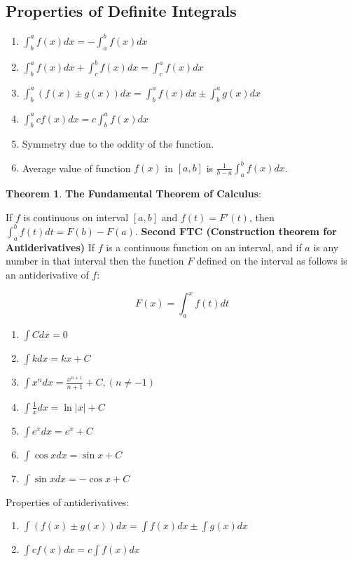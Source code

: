 \documentclass[12pt]{article}
\theoremstyle{definition}
\newtheorem{thm}{Theorem}[section]
\theoremstyle{definition}
\theoremstyle{remark}
\theoremstyle{definition}
\theoremstyle{definition}
\theoremstyle{definition}
\begin{document}
\subsection{Properties of Definite Integrals}	
	\begin{enumerate}
		\item $\int^a_b f(x) dx = -\int^b_a f(x) dx$
		\item $\int^a_b f(x) dx+\int^b_c f(x) dx=\int^a_c f(x) dx$
		\item $\int^a_b (f(x)\pm g(x)) dx=\int^a_b f(x) dx \pm \int^a_b g(x) dx$
		\item $\int^a_b cf(x) dx = c \int^a_b f(x) dx$
		\item Symmetry due to the oddity of the function.
		\item Average value of function $f(x)$ in $[a,b]$ is $\frac{1}{b-a} \int_{a}^{b}f(x)dx$.
	\end{enumerate}

\begin{thm}
\textbf{The Fundamental Theorem of Calculus}:

If $f$ is continuous on interval $[a,b]$ and $f(t)=F'(t)$, then $\int^b_a f(t) dt = F(b)-F(a).$
\textbf{Second FTC (Construction theorem for Antiderivatives)}
If $f$ is a continuous function on an interval, and if $a$ is any number in that interval then the function $F$ defined on the interval as follows is an antiderivative of $f$:

\[F(x)=\int^x_a f(t) dt\]
\end{thm}

\begin{enumerate}
\item	$\int C dx = 0$
\item	$\int kdx=kx+C$
\item	$\int x^ndx=\frac{x^{n+1}}{n+1}+C, (n \neq -1)$
\item	$\int \frac{1}{x}dx = \ln|x|+C$
\item	$\int e^xdx=e^x+C $
\item	$\int \cos xdx=\sin x + C $
\item	$\int \sin xdx=-\cos x + C $

\end{enumerate}


Properties of antiderivatives:

\begin{enumerate}
\item $\int (f(x) \pm g(x))dx=\int f(x) dx \pm \int g(x) dx$
\item $\int cf(x) dx = c \int f(x) dx$
\end{enumerate}
\end{document}
